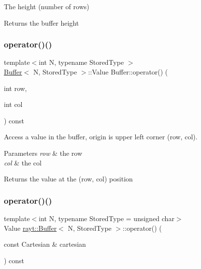 The height (number of rows) 

\begin{DoxyReturn}{Returns}
the buffer height 
\end{DoxyReturn}
\mbox{\label{classrayt_1_1_buffer_ae9b4a3c2c3357ca29b1b1847c303b1f7}} 
\subsubsection{\texorpdfstring{operator()()}{operator()()}\hspace{0.1cm}{\footnotesize\ttfamily [1/4]}}
{\footnotesize\ttfamily template$<$int N, typename Stored\+Type $>$ \\
\mbox{\hyperlink{classrayt_1_1_buffer}{Buffer}}$<$ N, Stored\+Type $>$\+::Value Buffer\+::operator() (\begin{DoxyParamCaption}\item[{int}]{row,  }\item[{int}]{col }\end{DoxyParamCaption}) const}



Access a value in the buffer, origin is upper left corner (row, col). 


\begin{DoxyParams}{Parameters}
{\em row} & the row \\
\hline
{\em col} & the col \\
\hline
\end{DoxyParams}
\begin{DoxyReturn}{Returns}
the value at the (row, col) position 
\end{DoxyReturn}
\mbox{\label{classrayt_1_1_buffer_a168bbd5188d83c5c003c291c23a84cfd}} 
\subsubsection{\texorpdfstring{operator()()}{operator()()}\hspace{0.1cm}{\footnotesize\ttfamily [2/4]}}
{\footnotesize\ttfamily template$<$int N, typename Stored\+Type = unsigned char$>$ \\
Value \mbox{\hyperlink{classrayt_1_1_buffer}{rayt\+::\+Buffer}}$<$ N, Stored\+Type $>$\+::operator() (\begin{DoxyParamCaption}\item[{const Cartesian \&}]{cartesian }\end{DoxyParamCaption}) const}



